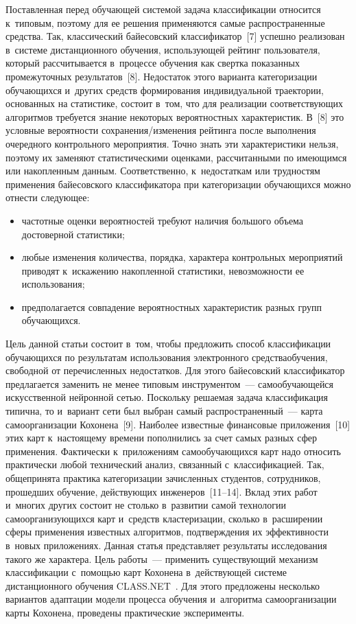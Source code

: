 \begin{multicols}{2}
     Поставленная перед обучающей системой задача классификации 
относится к~типовым, поэтому для ее решения применяются самые 
распространенные средства. Так, классический байесовский 
классификатор~[7] успешно реализован в~системе дистанционного обучения, 
использующей рейтинг пользователя, который рассчитывается в~процессе 
обучения как свертка показанных промежуточных результатов~[8]. 
Недостаток этого варианта категоризации обучающихся и~других средств 
формирования индивидуальной траектории, основанных на статистике, 
состоит в~том, что для реализации соответствующих алгоритмов требуется 
знание некоторых вероятностных характеристик. В~[8] это условные 
вероятности со\-хра\-не\-ния/из\-ме\-не\-ния рейтинга после выполнения 
очередного контрольного мероприятия. Точно знать эти характеристики 
нель\-зя, поэтому их заменяют статистическими оценками, рассчитанными по 
имеющимся или накопленным данным. Соответственно, к~недостаткам или 
трудностям применения байесовского классификатора при категоризации 
обучающихся можно отнести следующее:
     \begin{itemize}
\item частотные оценки вероятностей требуют наличия большого объема 
достоверной статистики;
\item любые изменения количества, порядка, характера контрольных 
мероприятий приводят к~искажению накопленной статистики, 
невозможности ее использования;
\item предполагается совпадение вероятностных характеристик разных групп 
обучающихся.
\end{itemize}

     Цель данной статьи состоит в~том, чтобы предложить способ 
классификации обучающихся по результатам использования электронного 
средства\linebreak обучения, свободной от перечисленных недостатков. Для этого 
байесовский классификатор предлагается заменить не менее типовым 
инструментом~--- самообучающейся искусственной \mbox{нейронной} \mbox{сетью}. 
Поскольку решаемая задача классификация типична, то и~вариант сети был 
выбран самый распространенный~--- карта самоорганизации Кохонена~[9]. 
Наиболее известные финансовые приложения~[10] этих карт к~настоящему 
времени пополнились за счет самых разных сфер применения. Фактически 
к~приложениям самообучающихся карт надо относить практически любой 
технический анализ, связанный с~классификацией. Так, общепринята 
практика категоризации зачисленных студентов, сотрудников, прошедших 
обучение, действующих инженеров~[11--14]. Вклад этих работ и~многих 
других состоит не столько в~развитии самой технологии 
самоорганизующихся карт и~средств кластеризации, сколько в~расширении 
сферы применения известных алгоритмов, подтверждения их эффективности в~новых приложениях. Данная статья представляет результаты исследования 
такого же характера. Цель работы~--- применить существующий механизм 
классификации с~помощью карт Кохонена в~действующей сис\-те\-ме 
дистанционного обучения CLASS.NET~\cite{15-bos}. Для этого предложены 
несколько вариантов адап\-та\-ции модели процесса обучения и~алгоритма 
самоорганизации карты Кохонена, проведены практические эксперименты.
     

\end{multicols}
